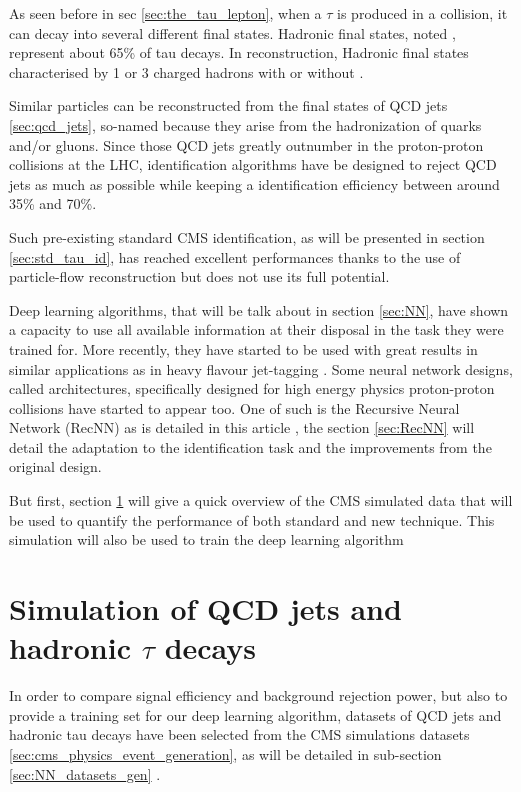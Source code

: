 
As seen before in sec \ref{sec:the_tau_lepton}, when a $\tau$ is produced in a collision, it can decay into several different final states.
Hadronic final states, noted \tauh, represent about 65\% of tau decays.
In reconstruction, Hadronic final states characterised by 1 or 3 charged hadrons with or without \pizero .

Similar particles can be reconstructed from the final states of QCD jets \ref{sec:qcd_jets}, so-named because they arise from the hadronization of quarks and/or gluons.
Since those QCD jets greatly outnumber \tauh in the proton-proton collisions at the LHC, \tauh identification algorithms have be designed to reject QCD jets as much as possible while keeping a \tauh identification efficiency between around 35\% and 70\%.

Such pre-existing standard CMS identification, as will be presented in section \ref{sec:std_tau_id}, has reached excellent performances thanks to the use of particle-flow reconstruction but does not use its full potential.

Deep learning algorithms, that will be talk about in section \ref{sec:NN}, have shown a capacity to use all available information at their disposal in the task they were trained for. More recently, they have started to be used with great results in similar applications as in heavy flavour jet-tagging \cite{btagging_NN}. Some neural network designs, called architectures, specifically designed for high energy physics proton-proton collisions have started to appear too. One of such is the Recursive Neural Network (RecNN) as is detailed in this article \cite{qcd_aware_RecNN}, the section \ref{sec:RecNN} will detail the adaptation to the \tauh identification task and the improvements from the original design.

But first, section \ref{sec:NN_datasets} will give a quick overview of the CMS simulated data that will be used to quantify the performance of both standard and new technique. This simulation will also be used to train the deep learning algorithm

\section{Simulation of QCD jets and hadronic $\tau$ decays}
\label{sec:NN_datasets}

In order to compare signal efficiency and background rejection power, but also to provide a training set for our deep learning algorithm, datasets of QCD jets and hadronic tau decays have been selected from the CMS simulations datasets \ref{sec:cms_physics_event_generation}, as will be detailed in sub-section \ref{sec:NN_datasets_gen} .

